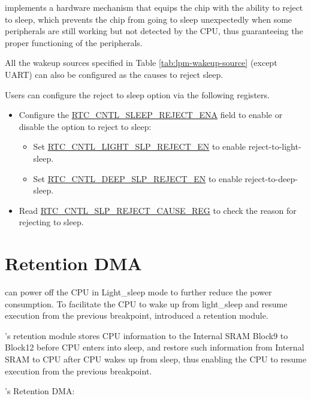 \documentclass[main\_\_EN.tex]{subfiles}
\begin{document}
\chipname{} implements a hardware mechanism that equips the chip with the ability to reject to sleep, which prevents the chip from going to sleep unexpectedly when some peripherals are still working but not detected by the CPU, thus guaranteeing the proper functioning of the peripherals.

All the wakeup sources specified in Table \ref{tab:lpm-wakeup-source} (except UART) can also be configured as the causes to reject sleep.

Users can configure the reject to sleep option via the following registers.
\begin{itemize}
    \item Configure the \hyperref[fielddesc:RTCCNTLSLEEPREJECTENA]{RTC\_CNTL\_SLEEP\_REJECT\_ENA} field to enable or disable the option to reject to sleep:
        \begin{itemize}
            \item Set \hyperref[fielddesc:RTCCNTLLIGHTSLPREJECTEN]{RTC\_CNTL\_LIGHT\_SLP\_REJECT\_EN} to enable reject-to-light-sleep.
            \item Set \hyperref[fielddesc:RTCCNTLDEEPSLPREJECTEN]{RTC\_CNTL\_DEEP\_SLP\_REJECT\_EN} to enable reject-to-deep-sleep.
        \end{itemize}
    \item Read \hyperref[fielddesc:RTCCNTLREJECTCAUSE]{RTC\_CNTL\_SLP\_REJECT\_CAUSE\_REG} to check the reason for rejecting to sleep.
\end{itemize}

\section{Retention DMA}

\chipname{} can power off the CPU in Light\_sleep mode to further reduce the power consumption. To facilitate the CPU to wake up from light\_sleep and resume execution from the previous breakpoint, \chipname{} introduced a retention module.

\chipname{}'s retention module stores CPU information to the Internal SRAM Block9 to Block12 before CPU enters into sleep, and restore such information from Internal SRAM to CPU after CPU wakes up from sleep, thus enabling the CPU to resume execution from the previous breakpoint.

\chipname{}'s Retention DMA:
\end{document}
